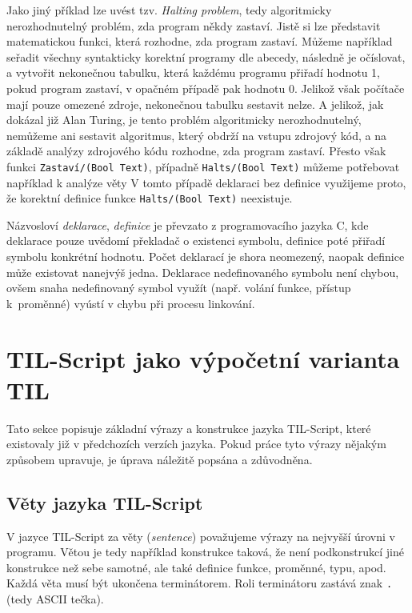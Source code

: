 Jako jiný příklad lze uvést tzv. \textit{Halting problem}, tedy algoritmicky nerozhodnutelný
problém, zda program někdy zastaví. Jistě si lze představit matematickou funkci, která rozhodne,
zda program zastaví. Můžeme například seřadit všechny syntakticky korektní programy dle abecedy,
následně je očíslovat, a vytvořit nekonečnou tabulku, která každému programu přiřadí hodnotu 1,
pokud program zastaví, v opačném případě pak hodnotu 0. Jelikož však počítače mají pouze omezené
zdroje, nekonečnou tabulku sestavit nelze. A jelikož, jak dokázal již Alan Turing, je tento problém
algoritmicky nerozhodnutelný, nemůžeme ani sestavit algoritmus, který obdrží na vstupu zdrojový kód,
a na základě analýzy zdrojového kódu rozhodne, zda program zastaví\cite{halting-problem-src}. Přesto
však funkci \lstinline{Zastaví/(Bool Text)}, případně \lstinline{Halts/(Bool Text)} můžeme
potřebovat například k analýze věty 
V tomto případě deklaraci bez definice využijeme proto, že korektní definice funkce
\lstinline{Halts/(Bool Text)} neexistuje.

Názvosloví \textit{deklarace}, \textit{definice} je převzato z programovacího jazyka C, kde
deklarace pouze uvědomí překladač o existenci symbolu, definice poté přiřadí symbolu konkrétní
hodnotu. Počet deklarací je shora neomezený, naopak definice může existovat nanejvýš jedna.
Deklarace nedefinovaného symbolu není chybou, ovšem snaha nedefinovaný symbol využít (např. volání
funkce, přístup k~proměnné) vyústí v chybu při procesu linkování.

\section{TIL-Script jako výpočetní varianta TIL}

Tato sekce popisuje základní výrazy a konstrukce jazyka TIL-Script, které existovaly již
v předchozích verzích jazyka. Pokud práce tyto výrazy nějakým způsobem upravuje, je úprava náležitě
popsána a zdůvodněna.\cite{til-script}\cite{vyletelek}

\subsection{Věty jazyka TIL-Script}

V jazyce TIL-Script za věty (\textit{sentence}) považujeme výrazy na nejvyšší úrovni v programu.
Větou je tedy například konstrukce taková, že není podkonstrukcí jiné konstrukce než sebe samotné,
ale také definice funkce, proměnné, typu, apod. Každá věta musí být ukončena terminátorem. Roli
terminátoru zastává znak \lstinline{.} (tedy ASCII tečka).

